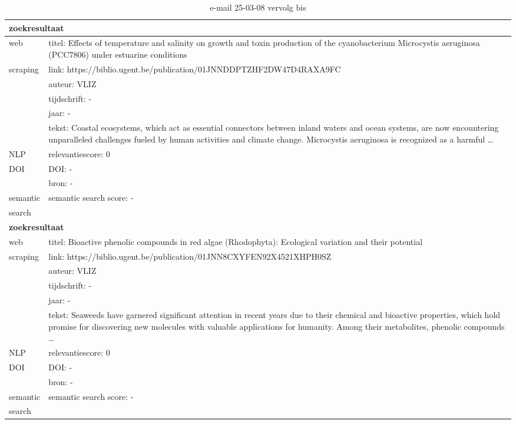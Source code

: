 \begin{table}[h!]
    \caption{e-mail 25-03-08 vervolg bis}
    \centering
    \begin{tabularx}{\textwidth}{|p{4cm}|X|} 
        \hline
        \multicolumn{2}{|X|}{\textbf{zoekresultaat}} \\
        \hline
        web &titel: Effects of temperature and salinity on growth and toxin production of the cyanobacterium Microcystis aeruginosa (PCC7806) under estuarine conditions\\
        scraping&link: https://biblio.ugent.be/publication/01JNNDDPTZHF2DW47D4RAXA9FC\\
        &auteur: VLIZ\\
        &tijdschrift: -\\
        &jaar: -\\
        &tekst: Coastal ecosystems, which act as essential connectors between inland waters and ocean systems, are now encountering unparalleled challenges fueled by human activities and climate change. Microcystis aeruginosa is recognized as a harmful …\\
        \hline
        NLP&relevantiescore: 0\\
        \hline
        DOI&DOI: -\\
        &bron: -\\
        \hline
        semantic&semantic search score: -\\
        search&\\
        \hline
        \multicolumn{2}{|X|}{\textbf{zoekresultaat}} \\
        \hline
        web &titel: Bioactive phenolic compounds in red algae (Rhodophyta): Ecological variation and their potential\\
        scraping&link: https://biblio.ugent.be/publication/01JNN8CXYFEN92X4521XHPH0SZ\\
        &auteur: VLIZ\\
        &tijdschrift: -\\
        &jaar: -\\
        &tekst: Seaweeds have garnered significant attention in recent years due to their chemical and bioactive properties, which hold promise for discovering new molecules with valuable applications for humanity. Among their metabolites, phenolic compounds …\\
        \hline
        NLP&relevantiescore: 0\\
        \hline
        DOI&DOI: -\\
        &bron: -\\
        \hline
        semantic&semantic search score: -\\
        search&\\
        \hline
    \end{tabularx}
    \label{table:email20250308vervolgbis}
\end{table}
